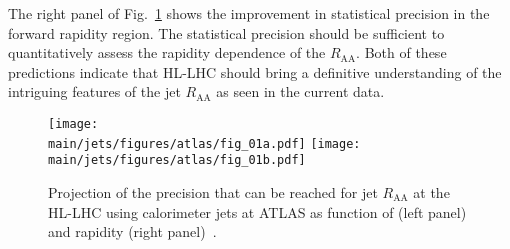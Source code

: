 The right panel of Fig.~\ref{fig:jetRAA} shows the improvement in statistical precision in the forward rapidity region. 
The statistical precision should be sufficient to quantitatively assess the rapidity dependence of the $R_\mathrm{AA}$. Both of these predictions indicate that HL-LHC should bring a definitive understanding of the intriguing features of the jet $R_\mathrm{AA}$ as seen in the current data.
\begin{figure}[!ht]
\begin{center}
\texttt{[image: \\main/jets/figures/atlas/fig\_01a.pdf]}
\texttt{[image: \\main/jets/figures/atlas/fig\_01b.pdf]}
\caption{Projection of the precision that can be reached for jet $R_{\mathrm{AA}}$ at the HL-LHC using calorimeter jets at ATLAS as function of \pT (left panel) and rapidity (right panel)~\cite{ATL-PHYS-PUB-2018-019}.}
\label{fig:jetRAA}
\end{center}
\end{figure}


